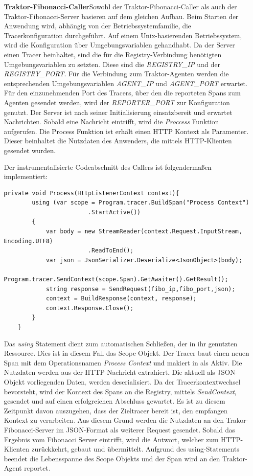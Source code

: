 \textbf{Traktor-Fibonacci-Caller}\space\space\space Sowohl der Traktor-Fibonacci-Caller als auch der Traktor-Fibonacci-Server basieren auf dem gleichen Aufbau. Beim Starten der Anwendung wird, abhängig von der Betriebssystemfamilie, die Tracerkonfiguration durchgeführt. 
Auf einem Unix-basierenden Betriebssystem, wird die Konfiguration über Umgebungsvariablen gehandhabt. 
Da der Server einen Tracer beinhaltet, sind die für die Registry-Verbindung benötigten Umgebungsvariablen zu setzten. 
Diese sind die \emph{REGISTRY\_IP} und der \emph{REGISTRY\_PORT}. 
Für die Verbindung zum Traktor-Agenten werden die entsprechenden Umgebungsvariablen \emph{AGENT\_IP} und \emph{AGENT\_PORT} erwartet.
Für den einzunehmenden Port des Tracers, über den die reporteten Spans zum Agenten gesendet werden, wird der \emph{REPORTER\_PORT} zur Konfiguration genutzt. 
Der Server ist nach seiner Initialisierung einsatzbereit und erwartet Nachrichten. 
Sobald eine Nachricht eintrifft, wird die \emph{Proccess} Funktion aufgerufen. 
Die Process Funktion ist erhält einen HTTP Kontext als Paramenter. 
Dieser beinhaltet die Nutzdaten des Anwenders, die mittels HTTP-Klienten gesendet wurden.

Der instrumentalisierte Codeabschnitt des Callers ist folgendermaßen implementiert:

\begin{minipage}[]{\textwidth}
	\begin{lstlisting}[frame=trBL]
	private void Process(HttpListenerContext context){
		using (var scope = Program.tracer.BuildSpan("Process Context")
						.StartActive())
		{
			var body = new StreamReader(context.Request.InputStream, Encoding.UTF8)
						.ReadToEnd();       
			var json = JsonSerializer.Deserialize<JsonObject>(body);
			Program.tracer.SendContext(scope.Span).GetAwaiter().GetResult();
			string response = SendRequest(fibo_ip,fibo_port,json);
			context = BuildResponse(context, response);
			context.Response.Close();
		}
	}
	\end{lstlisting}
	\label{listing:Process Funktion des Fibonacci-Caller Services}
\end{minipage}

Das \emph{using} Statement dient zum automatischen Schließen, der in ihr genutzten Ressource. 
Dies ist in diesem Fall das Scope Objekt. 
Der Tracer baut einen neuen Span mit dem Operationsnamen \emph{Process Context} und makiert in als Aktiv. 
Die Nutzdaten werden aus der HTTP-Nachricht extrahiert. 
Die aktuell als JSON-Objekt vorliegenden Daten, werden deserialisiert. 
Da der Tracerkontextwechsel bevorsteht, wird der Kontext des Spans an die Registry, mittels \emph{SendContext}, gesendet und auf einen erfolgreichen Abschluss gewartet. 
Es ist zu diesem Zeitpunkt davon auszugehen, dass der Zieltracer bereit ist, den empfangen Kontext zu verarbeiten. 
Aus diesem Grund werden die Nutzdaten an den Trakor-Fibonacci-Server im JSON-Format als weiterer Request gesendet. 
Sobald das Ergebnis vom Fibonacci Server eintrifft, wird die Antwort, welcher zum HTTP-Klienten zurückkehrt, gebaut und übermittelt. 
Aufgrund des using-Statements beendet die Lebensspanne des Scope Objekts und der Span wird an den Traktor-Agent reportet. 


